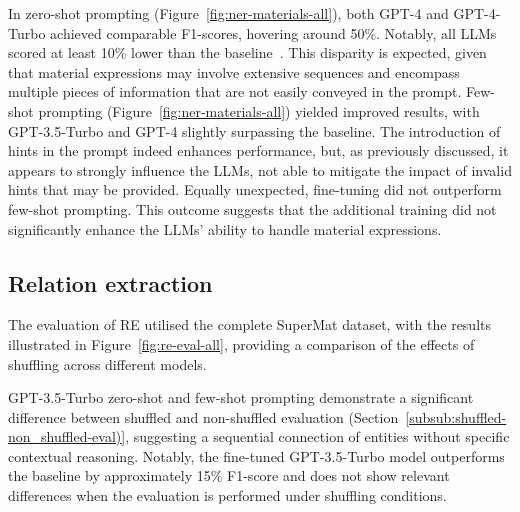 In zero-shot prompting (Figure~\ref{fig:ner-materials-all}), both GPT-4 and GPT-4-Turbo achieved comparable F1-scores, hovering around 50\%. Notably, all LLMs scored at least 10\% lower than the baseline~\cite{lfoppiano2023automatic}. This disparity is expected, given that material expressions may involve extensive sequences and encompass multiple pieces of information that are not easily conveyed in the prompt.
Few-shot prompting (Figure~\ref{fig:ner-materials-all}) yielded improved results, with GPT-3.5-Turbo and GPT-4 slightly surpassing the baseline. 
The introduction of hints in the prompt indeed enhances performance, but, as previously discussed, it appears to strongly influence the LLMs, not able to mitigate the impact of invalid hints that may be provided.
Equally unexpected, fine-tuning did not outperform few-shot prompting. This outcome suggests that the additional training did not significantly enhance the LLMs' ability to handle material expressions.

\subsection{Relation extraction}
\label{sec:results-re}

The evaluation of RE utilised the complete SuperMat dataset, with the results illustrated in Figure~\ref{fig:re-eval-all}, providing a comparison of the effects of shuffling across different models. 


GPT-3.5-Turbo zero-shot and few-shot prompting demonstrate a significant difference between shuffled and non-shuffled evaluation (Section~\ref{subsub:shuffled-non_shuffled-eval)}, suggesting a sequential connection of entities without specific contextual reasoning.
Notably, the fine-tuned GPT-3.5-Turbo model outperforms the baseline by approximately 15\% F1-score and does not show relevant differences when the evaluation is performed under shuffling conditions.

